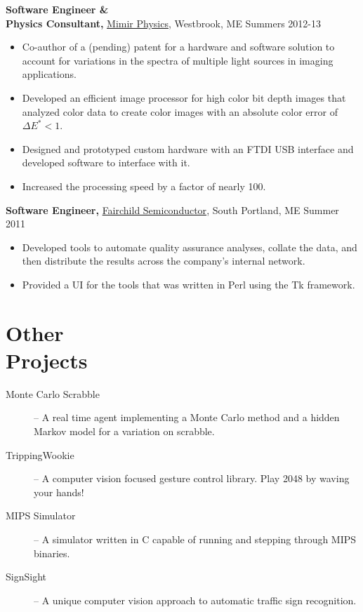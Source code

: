 \documentclass[margin]{res}
\begin{document}
\begin{minipage}{\textwidth}
\begin{resume}
{\bf Software Engineer \& \\ Physics Consultant,} \uline{Mimir Physics}, Westbrook, ME \hfill Summers 2012-13
 \begin{itemize} \itemsep -2pt  %
 \item Co-author of a (pending) patent for a hardware and software solution to account for variations in the spectra of multiple light sources in imaging applications.
 \item Developed an efficient image processor for high color bit depth images that analyzed color data to create color images with an absolute color error of $\Delta E^* < 1$.
 \item Designed and prototyped custom hardware with an FTDI USB interface  and developed software to interface with it.
 \item Increased the processing speed by a factor of nearly 100.
 \end{itemize}

 
 
{\bf Software Engineer,} \uline{Fairchild Semiconductor}, South Portland, ME \hfill  Summer 2011
\begin{itemize} \itemsep -2pt %
 \item Developed tools to automate quality assurance analyses, collate the data, and then distribute the results across the company's internal network.
 \item Provided a UI for the tools that was written in Perl using the Tk framework.
\end{itemize}

\section{Other \\ Projects}
\begin{description}
	\item[Monte Carlo Scrabble] --
		A real time agent implementing a Monte Carlo method and a hidden Markov model for a variation on scrabble.
	\item[TrippingWookie] --
		A computer vision focused gesture control library. Play 2048 by waving your hands!
	\item[MIPS Simulator] --
		A simulator written in C capable of running and stepping through MIPS binaries.
	\item[SignSight] --
		A unique computer vision approach to automatic traffic sign recognition.
\end{description}


\end{resume}
\end{minipage}
\end{document}
